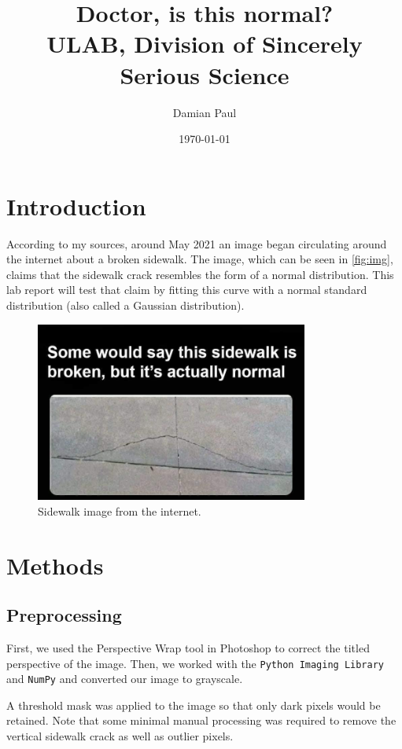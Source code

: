 \documentclass{article}
\title{Doctor, is this normal? \\ \large ULAB, Division of Sincerely Serious Science}
\author{Damian Paul}
\date{\today}
\begin{document}
\maketitle

\section{Introduction}
According to my sources, around May 2021 an image began circulating around the internet about a broken sidewalk. The image, which can be seen in \autoref{fig:img}, claims that the sidewalk crack resembles the form of a normal distribution. This lab report will test that claim by fitting this curve with a normal standard distribution (also called a Gaussian distribution).
\begin{figure}[h]
    \includegraphics[width=0.8\textwidth]{img.jpg}
    \centering
    \caption{Sidewalk image from the internet.}
    \label{fig:img}
\end{figure}

\section{Methods}
\subsection{Preprocessing}
First, we used the Perspective Wrap tool in Photoshop to correct the titled perspective of the image. Then, we worked with the \texttt{Python Imaging Library} and \texttt{NumPy} \cite{2020SciPy-NMeth} and converted our image to grayscale.

A threshold mask was applied to the image so that only dark pixels would be retained. Note that some minimal manual processing was required to remove the vertical sidewalk crack as well as outlier pixels.
\end{document}
